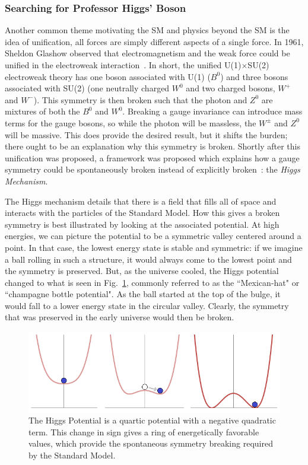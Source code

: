 \subsubsection{Searching for Professor Higgs' Boson}
\label{sec:findinghiggs}

Another common theme motivating the SM and physics beyond the SM is the idea of unification, all forces are simply different aspects of a single force. In 1961, Sheldon Glashow observed that electromagnetism and the weak force could be unified in the electroweak interaction~\cite{Glashow:1961}. In short, the unified U(1)$\times$SU(2) electroweak theory has one boson associated with U(1) ($B^{0}$) and three bosons associated with SU(2) (one neutrally charged $W^{0}$ and two charged bosons, $W^{+}$ and $W^{-}$). This symmetry is then broken such that the photon and $Z^{0}$ are mixtures of both the $B^{0}$ and $W^{0}$. Breaking a gauge invariance can introduce mass terms for the gauge bosons, so while the photon will be massless, the $W^{\pm}$ and $Z^{0}$ will be massive. This does provide the desired result, but it shifts the burden; there ought to be an explanation why this symmetry is broken. Shortly after this unification was proposed, a framework was proposed which explains how a gauge symmetry could be spontaneously broken instead of explicitly broken~\cite{Anderson:1963,Higgs:1964pj,Englert:1964et,Higgs:1964ia,Guralnik:1964eu}: the \textit{Higgs Mechanism}. 

The Higgs mechanism details that there is a field that fills all of space and interacts with the particles of the Standard Model. How this gives a broken symmetry is best illustrated by looking at the associated potential. At high energies, we can picture the potential to be a symmetric valley centered around a point. In that case, the lowest energy state is stable and symmetric: if we imagine a ball rolling in such a structure, it would always come to the lowest point and the symmetry is preserved. But, as the universe cooled, the Higgs potential changed to what is seen in Fig.~\ref{fig:HiggsPotential}, commonly referred to as the ``Mexican-hat" or ``champagne bottle potential". As the ball started at the top of the bulge, it would fall to a lower energy state in the circular valley. Clearly, the symmetry that was preserved in the early universe would then be broken.

\begin{figure}[hbt]
\begin{center}
\includegraphics[width=.6\linewidth]{Introduction/figures/SpontaneousSymmetryBreaking.png}
\caption[The Higgs Mechanism - FROM WIKIPEDIA]{The Higgs Potential is a quartic potential with a negative quadratic term. This change in sign gives a ring of energetically favorable values, which provide the spontaneous symmetry breaking required by the Standard Model.}
\label{fig:HiggsPotential}
\end{center}
\end{figure}

